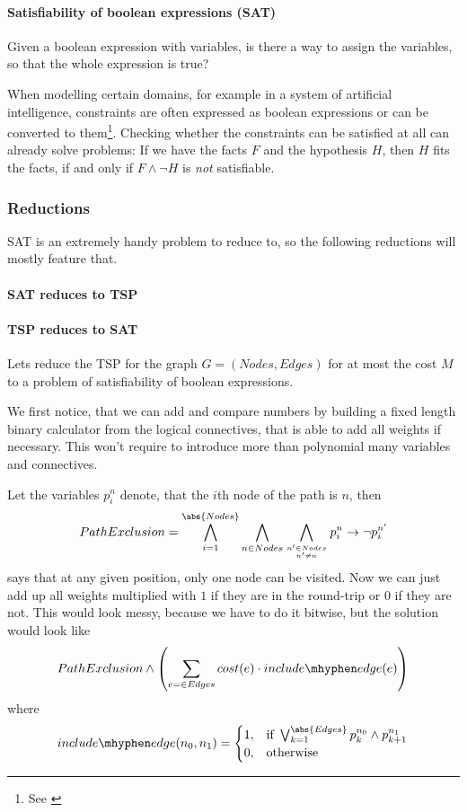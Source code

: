 \paragraph{Satisfiability of boolean expressions (SAT)}
Given a boolean expression with variables, is there a way to assign the 
variables, so that the whole expression is true?
\begin{example}[Relevance]
	When modelling certain domains, for example in a system of artificial
	intelligence, constraints are often expressed as boolean expressions or can
	be converted to them\footnote{See \cite{russell1995artificial}}. Checking
	whether the constraints can be satisfied at all can already solve problems:
	If we have the facts $F$ and the hypothesis $H$, then $H$ fits the facts, if
	and only if $F\wedge\lnot H$ is \emph{not} satisfiable.
\end{example}
\subsubsection{Reductions}
SAT is an extremely handy problem to reduce to, so the following reductions 
will mostly feature that.
\paragraph{SAT reduces to TSP}
\TODO
\paragraph{TSP reduces to SAT}
Lets reduce the TSP for the graph $G = (Nodes, Edges)$ for at most the cost 
$M$ to a problem of satisfiability of boolean expressions.

We first notice, that we can add and compare numbers by building a fixed 
length binary calculator from the logical connectives, that is able to add 
all weights if necessary. This won't require to introduce more than 
polynomial many variables and connectives.

Let the variables $p_i^n$ denote, that the $i$th node of the path is $n$, 
then 
\[ PathExclusion = \bigwedge_{i=1}^{\abs{Nodes}}\bigwedge_{n\in Nodes} \bigwedge_{n'\in Nodes\atop n'\neq n} p_i^n \rightarrow \lnot p_i^{n'}\]
says that at any given position, only one node can be visited. Now we can 
just add up all weights multiplied with $1$ if they are in the round-trip or 
$0$ if they are not. This would look messy, because we have to do it bitwise, 
but the solution would look like
\[
	PathExclusion \wedge \left( \sum_{e=\in Edges} cost(e)\cdot 
	include\mhyphen edge(e) \right) \]
where 
\[ include\mhyphen edge(n_0, n_1)= \begin{cases}
		1, &\text{if }\bigvee_{k=1}^{\abs{Edges}} p_k^{n_0} \wedge p_{k+1}^{n_1}\\
		0, &\text{otherwise }
	\end{cases}\]

